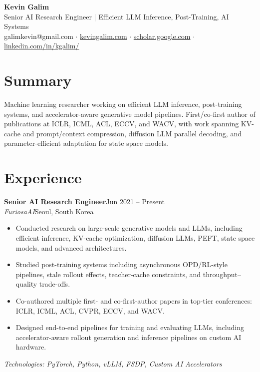 \documentclass[10pt,a4paper]{article}
\newcommand{\cvevent}[4]{%
  \noindent\textbf{#1}\hfill{\small\color{lightgray}#3}\\
  \textit{#2}\hfill{\small\color{lightgray}#4}
  \vspace{2pt}
}
\begin{document}
\begin{center}
  {\Huge\bfseries Kevin Galim}\\[2pt]
  {\normalsize\color{lightgray} Senior AI Research Engineer | Efficient LLM Inference, Post-Training, AI Systems}\\[2pt]
  \small
  galimkevin@gmail.com $\cdot$
  \href{https://kevingalim.com}{kevingalim.com} $\cdot$
  \href{https://scholar.google.com/citations?user=G1EpeWYAAAAJ}{scholar.google.com} $\cdot$
  \href{https://www.linkedin.com/in/kgalim/}{linkedin.com/in/kgalim/}
\end{center}
\vspace{4pt}

\section{Summary}
Machine learning researcher working on efficient LLM inference, post-training systems, and accelerator-aware generative model pipelines. First/co-first author of publications at ICLR, ICML, ACL, ECCV, and WACV, with work spanning KV-cache and prompt/context compression, diffusion LLM parallel decoding, and parameter-efficient adaptation for state space models.


\section{Experience}
\cvevent{Senior AI Research Engineer}{FuriosaAI}{Jun 2021 -- Present}{Seoul, South Korea}
\begin{itemize}
  \item Conducted research on large-scale generative models and LLMs, including efficient inference, KV-cache optimization, diffusion LLMs, PEFT, state space models, and advanced architectures.
  \item Studied post-training systems including asynchronous OPD/RL-style pipelines, stale rollout effects, teacher-cache constraints, and throughput--quality trade-offs.
  \item Co-authored multiple first- and co-first-author papers in top-tier conferences: ICLR, ICML, ACL, CVPR, ECCV, and WACV.
  \item Designed end-to-end pipelines for training and evaluating LLMs, including accelerator-aware rollout generation and inference pipelines on custom AI hardware.
\end{itemize}
\noindent\textit{\small Technologies: PyTorch, Python, vLLM, FSDP, Custom AI Accelerators}
\vspace{6pt}
\end{document}
